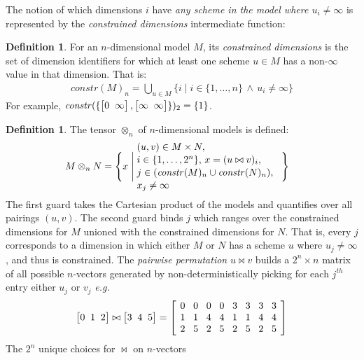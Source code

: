 \documentclass[10pt,preprint]{sigplanconf}
\newcounter{block}
\theoremstyle{definition}
\newtheorem{definition}[block]{Definition}
\newcommand{\eg}{\emph{e.g.}}
\newcommand{\vtwoh}[2]{\setlength{\arraycolsep}{0em}
\left[\begin{array}{cc}#1 \; & \; #2\end{array}\right]}
\newcommand{\vthreeh}[3]{\setlength{\arraycolsep}{0em}
\left[\begin{array}{ccc}#1 \; & \; #2 \; & \; #3\end{array}\right]}
\newcommand{\effdims}[2]{\mathit{constr}(#1)_{#2}}
\begin{document}
The notion of which dimensions $i$ have \emph{any scheme in the model
where $u_i \neq \infty$} is represented by the \emph{constrained
dimensions} intermediate function:
\begin{definition}%
For an $n$-dimensional model $M$, its \emph{constrained dimensions}
is the set of dimension identifiers for which at least one scheme $u \in M$ has
a non-$\infty$ value in that dimension. That is:
%
\begin{align*}
\effdims{M}{n} =
\bigcup_{u \in M} \{i \mid i \in \{1,\ldots,n\} \, \wedge \, u_i \neq
  \infty\}
\end{align*}
For example, $\effdims{\{\vtwoh{0}{\infty},\vtwoh{\infty}{\infty}\}}{2}
 = \{1\}$.
\end{definition}
\begin{definition}The tensor $\otimes_n$ of $n$-dimensional
models is defined:
\begin{alignat*}{2}
& M \otimes_n N =
  \Bigg\{x \; \Bigg| \;
    \parbox{5.2cm}{$(u, v) \in M \times N,$ \\[0.1em]
                  $\;\; i \in \{1, \ldots, 2^n\}, \,
                  x = (u \bowtie v)_i,$ \\[0.1em]
                  $\;\; j \in (\effdims{M}{n} \cup
                   \effdims{N}{n}),$\\[0.1em]
                   $\;\; x_j \neq \infty$
                  } \Bigg\}
\end{alignat*}
The first guard takes the Cartesian product of
the models and quantifies over all pairings $(u, v)$.
The second guard binds $j$ which ranges over the constrained
dimensions for $M$ unioned with the constrained dimensions for $N$.
That is, every $j$ corresponds to a dimension in which
either $M$ or $N$ has a scheme $u$ where $u_j \neq \infty$,
and thus is constrained.
The \emph{pairwise permutation} $u \bowtie v$
builds a $2^n \times n$ matrix
of all possible $n$-vectors generated by
non-deterministically picking for each $j^{th}$ entry either
$u_j$ or $v_j$ \eg{}
%
\begin{equation*}
\vthreeh{0}{1}{2} \bowtie \vthreeh{3}{4}{5} =
\left[
\setlength{\arraycolsep}{0.42em}
\begin{array}{cccccccc}
0 & 0 & 0 & 0 & 3 & 3 & 3 & 3 \\
1 & 1 & 4 & 4 & 1 & 1 & 4 & 4 \\
2 & 5 & 2 & 5 & 2 & 5 & 2 & 5
\end{array}
\right]
\end{equation*}
%
The $2^n$ unique choices for $\bowtie$ on $n$-vectors

\end{definition}
\end{document}
